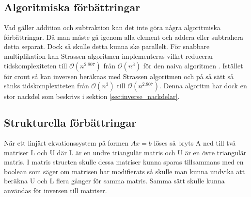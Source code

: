 \subsection{Algoritmiska förbättringar}
Vad gäller addition och subtraktion kan det inte göra några algoritmiska förbättringar. Då man måste gå igenom alla element och addera eller subtrahera detta separat. Dock så skulle detta kunna ske parallelt\citep{Anderson1968}.
För snabbare multiplikation kan Strassen algoritmen implementeras vilket reducerar tidskomplexiteten till $\mathcal{O}(n^{2.807})$ från $\mathcal{O}(n^3)$ för den naiva algoritmen \citep{Strassen1969}. Istället för crout så kan inversen beräknas med Strassen algoritmen och på så sätt så sänks tidskomplexiteten från $\mathcal{O}(n^3)$ till $\mathcal{O}(n^{2.807})$. Denna algoritm har dock en stor nackdel som beskrivs i sektion \ref{sec:inverse_nackdelar}.

\subsection{Strukturella förbättringar}
När ett linjärt ekvationssystem på formen $Ax=b $ löses så bryts A ned till två matriser L och U där L är en undre triangulär matris och U är en övre triangulär matris\citep{Ching}. I matris structen skulle dessa matriser kunna sparas tillsammans med en boolean som säger om matrisen har modifierats så skulle man kunna undvika att beräkna U och L flera gånger för samma matris. Samma sätt skulle kunna användas för inversen till matriser. 

